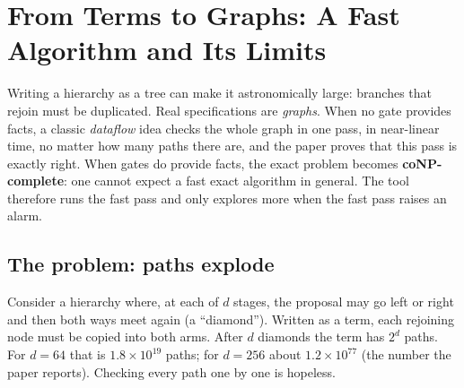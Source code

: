 \section{From Terms to Graphs: A Fast Algorithm and Its Limits}
\label{ch:graphs}

\begin{bigidea}
Writing a hierarchy as a tree can make it astronomically large: branches that rejoin must be duplicated. Real specifications are \emph{graphs}. When no gate provides facts, a classic \emph{dataflow} idea checks the whole graph in one pass, in near-linear time, no matter how many paths there are, and the paper proves that this pass is exactly right. When gates do provide facts, the exact problem becomes \textbf{coNP-complete}: one cannot expect a fast exact algorithm in general. The tool therefore runs the fast pass and only explores more when the fast pass raises an alarm.
\end{bigidea}

\subsection{The problem: paths explode}

Consider a hierarchy where, at each of $d$ stages, the proposal may go left or right and then both ways meet again (a ``diamond''). Written as a term, each rejoining node must be copied into both arms. After $d$ diamonds the term has $2^d$ paths. For $d=64$ that is $1.8\times10^{19}$ paths; for $d=256$ about $1.2\times10^{77}$ (the number the paper reports). Checking every path one by one is hopeless.

\begin{center}
\end{center}

